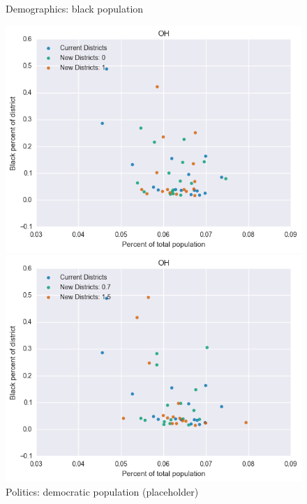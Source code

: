 \begin{figure}[htb!] \centering
\caption{ Demographics: black population }
\includegraphics[width=4.5in]{../analysis/OH/analysis_scatter.png}
\caption{ Politics: democratic population (placeholder)}
\includegraphics[width=4.5in]{../analysis/OH/analysis_scatter2.png}
\end{figure}

\clearpage
\newpage

